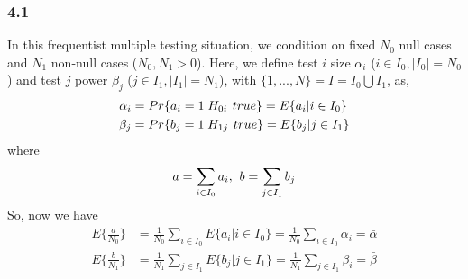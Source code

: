 \documentclass{article}
\begin{document}
\subsubsection*{4.1}
In this frequentist multiple testing situation, we condition on fixed
$N_0$ null cases and $N_1$ non-null cases ($N_0,N_1 > 0$).
Here, we define test $i$ size $\alpha_i$ ($i \in I_0, |I_0|=N_0$) and
test $j$ power $\beta_j$ ($j \in I_1, |I_1| = N_1$), 
with $\{1,...,N\} = I = I_0 \bigcup I_1$, as,  
\begin{displaymath}
\begin{split}
\alpha_i &= Pr\{a_i = 1 | H_{0i} \hspace{4 pt} true\} = E\{a_i | i\in I_0\}\\
\beta_j &= Pr\{b_j = 1 | H_{1j} \hspace{4 pt} true\} = E\{b_j | j\in I_1\}
\end{split}
\end{displaymath}
where
\begin{displaymath}
a = \sum_{i\in I_0} a_i, \hspace{4 pt} b = \sum_{j \in I_1} b_j
\end{displaymath}
So, now we have
\begin{displaymath}
\begin{split}
E\{\frac{a}{N_0}\} & = \frac{1}{N_0} \sum_{i\in I_0} E\{a_i | i\in I_0\} 
= \frac{1}{N_0} \sum_{i\in I_0} \alpha_i = \bar{\alpha} \\
E\{\frac{b}{N_1}\} & = \frac{1}{N_1} \sum_{j\in I_1} E\{b_j | j\in I_1\} 
= \frac{1}{N_1} \sum_{j\in I_1} \beta_i = \bar{\beta} 
\end{split}
\end{displaymath}
\end{document}
